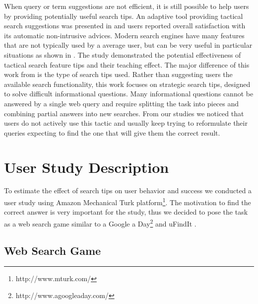 \documentclass{sig-alternate}
\begin{document}
When query or term suggestions are not efficient, it is still possible to help users by providing potentially useful search tips.
An adaptive tool providing tactical search suggestions was presented in \cite{Kriewel2007} and users reported overall satisfaction with its automatic non-intrusive advices.
Modern search engines have many features that are not typically used by a average user, but can be very useful in particular situations as shown in \cite{Moraveji:2011:MIU:2009916.2009966}. The study demonstrated the potential effectiveness of tactical search feature tips and their teaching effect.
The major difference of this work from \cite{Moraveji:2011:MIU:2009916.2009966} is the type of search tips used.
Rather than suggesting users the available search functionality, this work focuses on strategic search tips, designed to solve difficult informational questions.
Many informational questions cannot be answered by a single web query and require splitting the task into pieces and combining partial answers into new searches. From our studies we noticed that users do not actively use this tactic and usually keep trying to reformulate their queries expecting to find the one that will give them the correct result.



\section{User Study Description}
To estimate the effect of search tips on user behavior and success we conducted a user study using Amazon Mechanical Turk platform\footnote{http://www.mturk.com/}. 
The motivation to find the correct answer is very important for the study, thus we decided to pose the task as a web search game similar to a Google a Day\footnote{http://www.agoogleaday.com/} and uFindIt \cite{Ageev:2011:FYG:2009916.2009965}. 

\subsection{Web Search Game}
\end{document}
